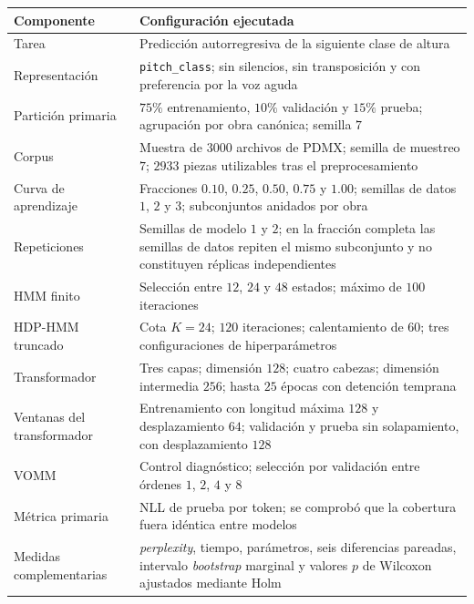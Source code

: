 \begin{tabular}{p{} p{}}
\hline
Componente & Configuración ejecutada \\
\hline
Tarea & Predicción autorregresiva de la siguiente clase de altura \\
Representación & \texttt{pitch\_class}; sin silencios, sin transposición y con preferencia por la voz aguda \\
Partición primaria & $75\%$ entrenamiento, $10\%$ validación y $15\%$ prueba; agrupación por obra canónica; semilla $7$ \\
Corpus & Muestra de $3000$ archivos de PDMX; semilla de muestreo $7$; $2933$ piezas utilizables tras el preprocesamiento \\
Curva de aprendizaje & Fracciones $0.10$, $0.25$, $0.50$, $0.75$ y $1.00$; semillas de datos $1$, $2$ y $3$; subconjuntos anidados por obra \\
Repeticiones & Semillas de modelo $1$ y $2$; en la fracción completa las semillas de datos repiten el mismo subconjunto y no constituyen réplicas independientes \\
HMM finito & Selección entre $12$, $24$ y $48$ estados; máximo de $100$ iteraciones \\
HDP-HMM truncado & Cota $K=24$; $120$ iteraciones; calentamiento de $60$; tres configuraciones de hiperparámetros \\
Transformador & Tres capas; dimensión $128$; cuatro cabezas; dimensión intermedia $256$; hasta $25$ épocas con detención temprana \\
Ventanas del transformador & Entrenamiento con longitud máxima $128$ y desplazamiento $64$; validación y prueba sin solapamiento, con desplazamiento $128$ \\
VOMM & Control diagnóstico; selección por validación entre órdenes $1$, $2$, $4$ y $8$ \\
Métrica primaria & NLL de prueba por token; se comprobó que la cobertura fuera idéntica entre modelos \\
Medidas complementarias & \emph{perplexity}, tiempo, parámetros, seis diferencias pareadas, intervalo \emph{bootstrap} marginal y valores $p$ de Wilcoxon ajustados mediante Holm \\
\hline
\end{tabular}
